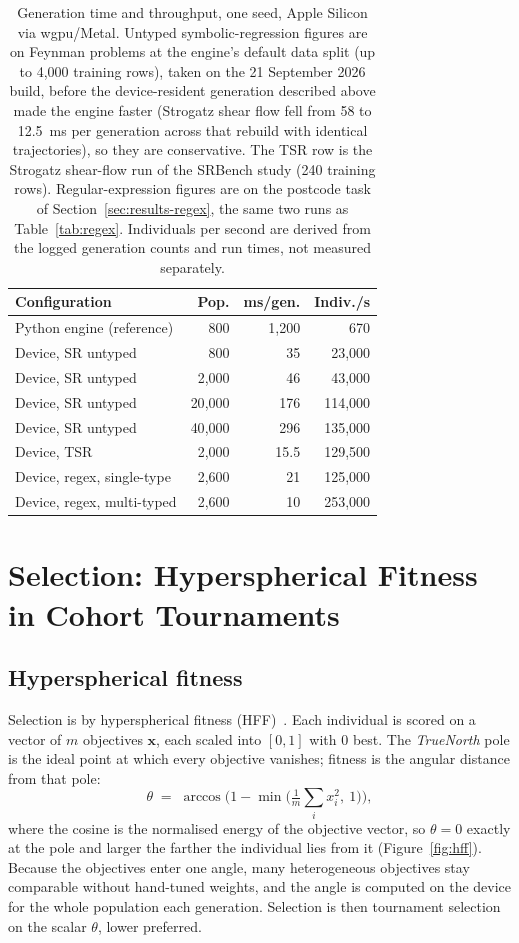 \documentclass[sigconf,nonacm]{acmart}
\begin{document}
\begin{table}[t]
\caption{Generation time and throughput, one seed, Apple Silicon via wgpu/Metal.
Untyped symbolic-regression figures are on Feynman problems at the engine's
default data split (up to 4{,}000 training rows), taken on the 21 September
2026 build, before the device-resident generation described above made the
engine faster (Strogatz shear flow fell from 58 to 12.5~ms per generation across
that rebuild with identical trajectories), so they are conservative. The TSR
row is the Strogatz shear-flow run of the SRBench study (240 training rows).
Regular-expression figures are on the postcode task of
Section~\ref{sec:results-regex}, the same two runs as Table~\ref{tab:regex}.
Individuals per second are derived from the logged generation counts and run
times, not measured separately.}
\label{tab:throughput}
\small
\begin{tabular}{@{}lrrr@{}}
\toprule
Configuration & Pop. & ms/gen. & Indiv./s \\
\midrule
Python engine (reference) & 800 & 1{,}200 & 670 \\
Device, SR untyped & 800 & 35 & 23{,}000 \\
Device, SR untyped & 2{,}000 & 46 & 43{,}000 \\
Device, SR untyped & 20{,}000 & 176 & 114{,}000 \\
Device, SR untyped & 40{,}000 & 296 & 135{,}000 \\
Device, TSR & 2{,}000 & 15.5 & 129{,}500 \\
Device, regex, single-type & 2{,}600 & 21 & 125{,}000 \\
Device, regex, multi-typed & 2{,}600 & 10 & 253{,}000 \\
\bottomrule
\end{tabular}
\end{table}

\section{Selection: Hyperspherical Fitness in Cohort Tournaments}
\label{sec:selection}

\subsection{Hyperspherical fitness}

Selection is by hyperspherical fitness (HFF)~\cite{morgan2026hff}. Each
individual is scored on a vector of $m$ objectives $\mathbf{x}$, each scaled
into $[0,1]$ with $0$ best. The \emph{TrueNorth} pole is the ideal point at which
every objective vanishes; fitness is the angular distance from that pole:
\[
\theta \;=\; \arccos\!\Big(1 - \min\big(\tfrac{1}{m}\textstyle\sum_i x_i^2,\ 1\big)\Big),
\]
where the cosine is the normalised energy of the objective vector, so
$\theta=0$ exactly at the pole and larger the farther the individual lies from
it (Figure~\ref{fig:hff}). Because the objectives enter one angle, many
heterogeneous objectives stay comparable without hand-tuned weights, and the
angle is computed on the device for the whole population each generation.
Selection is then tournament selection on the scalar $\theta$, lower preferred.
\end{document}

